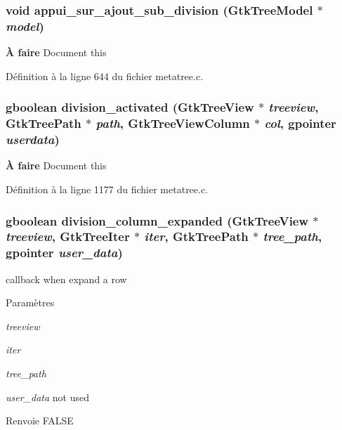 \subsubsection[{appui\_\-sur\_\-ajout\_\-sub\_\-division}]{\setlength{\rightskip}{0pt plus 5cm}void appui\_\-sur\_\-ajout\_\-sub\_\-division (GtkTreeModel $\ast$ {\em model})}\label{metatree_8h_adc51b18c5d2db6840fe918ca84067139}
\begin{Desc}
\item[{\bf À faire}]Document this\end{Desc}


Définition à la ligne 644 du fichier metatree.c.

\subsubsection[{division\_\-activated}]{\setlength{\rightskip}{0pt plus 5cm}gboolean division\_\-activated (GtkTreeView $\ast$ {\em treeview}, \/  GtkTreePath $\ast$ {\em path}, \/  GtkTreeViewColumn $\ast$ {\em col}, \/  gpointer {\em userdata})}\label{metatree_8h_a2016821cfa93c13034c3934f60b39473}
\begin{Desc}
\item[{\bf À faire}]Document this\end{Desc}


Définition à la ligne 1177 du fichier metatree.c.

\subsubsection[{division\_\-column\_\-expanded}]{\setlength{\rightskip}{0pt plus 5cm}gboolean division\_\-column\_\-expanded (GtkTreeView $\ast$ {\em treeview}, \/  GtkTreeIter $\ast$ {\em iter}, \/  GtkTreePath $\ast$ {\em tree\_\-path}, \/  gpointer {\em user\_\-data})}\label{metatree_8h_ad695aea21eec466bbace0cd9a26067f9}
callback when expand a row


\begin{DoxyParams}{Paramètres}
\item[{\em treeview}]\item[{\em iter}]\item[{\em tree\_\-path}]\item[{\em user\_\-data}]not used\end{DoxyParams}
\begin{DoxyReturn}{Renvoie}
FALSE 
\end{DoxyReturn}


